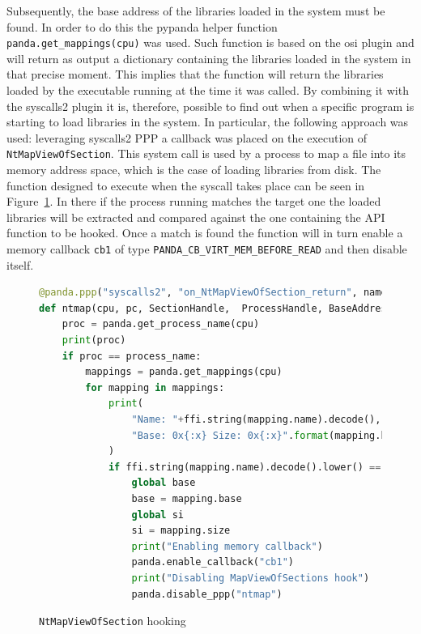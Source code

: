 Subsequently, the base address of the libraries loaded in the system must be found. In order to do this the pypanda helper function \lstinline{panda.get_mappings(cpu)} was used. Such function is based on the osi plugin and will return as output a dictionary containing the libraries loaded in the system in that precise moment. This implies that the function will return the libraries loaded by the executable running at the time it was called. By combining it with the syscalls2 plugin it is, therefore, possible to find out when a specific program is starting to load libraries in the system. In particular, the following approach was used: leveraging syscalls2 PPP a callback was placed on the execution of \lstinline{NtMapViewOfSection}. This system call is used by a process to map a file into its memory address space, which is the case of loading libraries from disk. The function designed to execute when the syscall takes place can be seen in Figure~\ref{fig:ntmap}. In there if the process running matches the target one the loaded libraries will be extracted and compared against the one containing the API function to be hooked. Once a match is found the function will in turn enable a memory callback \lstinline{cb1} of type \lstinline{PANDA_CB_VIRT_MEM_BEFORE_READ} and then disable itself.

\begin{figure}[htp]
\centering
\begin{lstlisting}[language=Python] 
@panda.ppp("syscalls2", "on_NtMapViewOfSection_return", name="ntmap")
def ntmap(cpu, pc, SectionHandle,  ProcessHandle, BaseAddress, ZeroBits, CommitSize, SectionOffset, ViewSize, InheritDisposition, AllocationType, Win32Protect):
    proc = panda.get_process_name(cpu)
    print(proc)
    if proc == process_name:
        mappings = panda.get_mappings(cpu)
        for mapping in mappings:
            print(
                "Name: "+ffi.string(mapping.name).decode(),
                "Base: 0x{:x} Size: 0x{:x}".format(mapping.base,mapping.size)
            )
            if ffi.string(mapping.name).decode().lower() == "kernel32.dll":
                global base
                base = mapping.base
                global si
                si = mapping.size
                print("Enabling memory callback")
                panda.enable_callback("cb1")
                print("Disabling MapViewOfSections hook")
                panda.disable_ppp("ntmap")
\end{lstlisting}
\caption{\lstinline{NtMapViewOfSection} hooking}
\label{fig:ntmap}
\end{figure}


